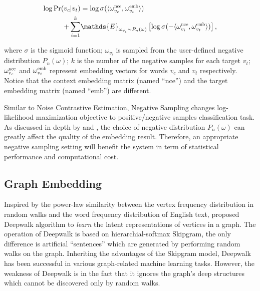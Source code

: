 \documentclass[letterpaper]{article}
\begin{document}
            \begin{equation}
                \label{eq:objneg}
                \begin{aligned}
                \log \mbox{Pr} (v_c | v_t) & = \log \sigma( \langle \omega^{\scalebox{0.7}{nce}}_{v_c} , \omega^{\scalebox{0.7}{emb}}_{v_t} \rangle ) \\
                + \sum_{i=1}^{k} & \mathds{E}_{\omega_{v_i} \sim P_n(\omega)} \left[ \log \sigma( -\langle \omega^{\scalebox{0.7}{nce}}_{v_i} , \omega^{\scalebox{0.7}{emb}}_{v_t} \rangle) \right],
                \end{aligned}
            \end{equation}
            
            \noindent
            where $\sigma$ is the sigmoid function; $\omega_{v_i}$ is sampled from the user-defined
            negative distribution $P_n(\omega)$; $k$ is the number of the negative samples for each target
            $v_t$; $\omega^{\scalebox{0.7}{nce}}_{v_c}$ and $\omega^{\scalebox{0.7}{emb}}_{v_t}$ 
            represent embedding vectors for words $v_c$ and $v_t$ respectively. Notice that the
            context embedding matrix (named ``nce'') and the target embedding matrix (named ``emb'')
            are different.

            Similar to Noise Contrastive Estimation, Negative Sampling changes log-likelihood
            maximization objective to positive/negative samples classification task. As discussed
            in depth by \cite{nce} and \cite{skipgram}, the choice of negative distribution 
            $P_n(\omega)$ can greatly affect the quality of the embedding result. Therefore, an
            appropriate negative sampling setting will benefit the system in term of statistical
            performance and computational cost.

        \subsection{Graph Embedding}
            
            Inspired by the power-law similarity between the vertex frequency distribution in
            random walks and the word frequency distribution of English text, \citeauthor{deepwalk} proposed
            Deepwalk algorithm to \emph{learn} the latent representations of vertices in a
            graph. The operation of Deepwalk is based on hierarchial-softmax
            Skipgram, the only difference is artificial ``sentences'' which are generated by performing
            random walks on the graph. Inheriting the advantages of the Skipgram model, Deepwalk
            has been successful in various graph-related machine learning tasks. However, the weakness
            of Deepwalk is in the fact that it ignores the graph's deep structures which cannot 
            be discovered only by random walks. 
\end{document}
